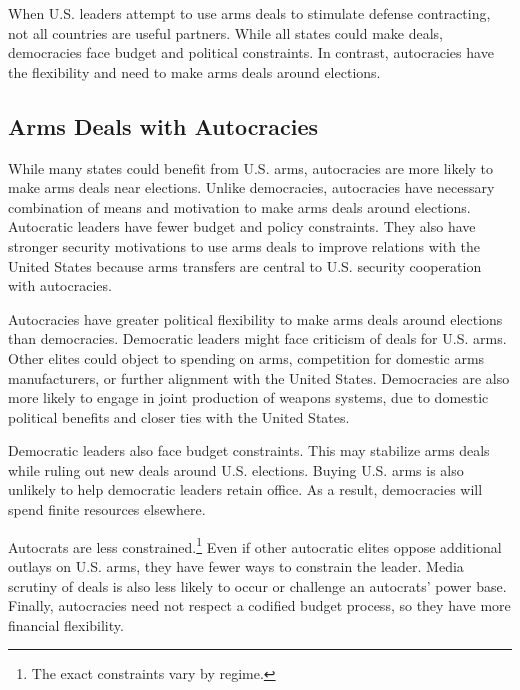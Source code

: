 \documentclass[12pt]{article}
\begin{document}
When U.S. leaders attempt to use arms deals to stimulate defense contracting, not all countries are useful partners. 
While all states could make deals, democracies face budget and political constraints. 
In contrast, autocracies have the flexibility and need to make arms deals around elections.



\subsection{Arms Deals with Autocracies}


While many states could benefit from U.S. arms, autocracies are more likely to make arms deals near elections. 
Unlike democracies, autocracies have necessary combination of means and motivation to make arms deals around elections.
Autocratic leaders have fewer budget and policy constraints. 
They also have stronger security motivations to use arms deals to improve relations with the United States because arms transfers are central to U.S. security cooperation with autocracies.


Autocracies have greater political flexibility to make arms deals around elections than democracies. 
Democratic leaders might face criticism of deals for U.S. arms.
Other elites could object to spending on arms, competition for domestic arms manufacturers, or further alignment with the United States.
Democracies are also more likely to engage in joint production of weapons systems, due to domestic political benefits and closer ties with the United States.


Democratic leaders also face budget constraints.
This may stabilize arms deals while ruling out new deals around U.S. elections.
Buying U.S. arms is also unlikely to help democratic leaders retain office. 
As a result, democracies will spend finite resources elsewhere. 


Autocrats are less constrained.\footnote{The exact constraints vary by regime.}
Even if other autocratic elites oppose additional outlays on U.S. arms, they have fewer ways to constrain the leader.
Media scrutiny of deals is also less likely to occur or challenge an autocrats' power base. 
Finally, autocracies need not respect a codified budget process, so they have more financial flexibility.  
\end{document}
